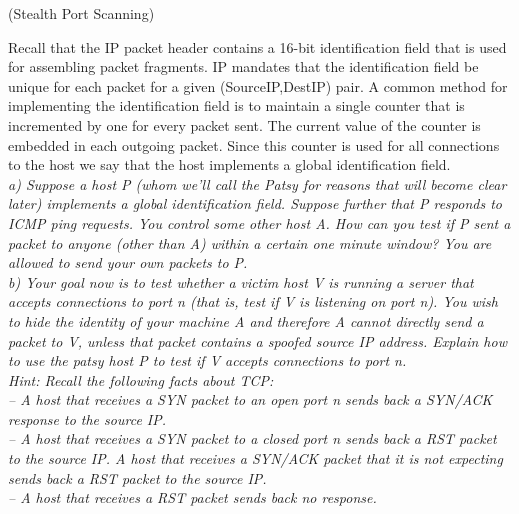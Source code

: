 \begin{prob}  (Stealth Port Scanning) 
\end{prob}

\noindent Recall that the IP packet header contains a 16-bit identification field that is used for assembling packet fragments. IP mandates that the identification field be unique for each packet for a given (SourceIP,DestIP) pair. A common method for implementing the identification field is to maintain a single counter that is incremented by one for every packet sent. The current value of the counter is embedded in each outgoing packet. Since this counter is used for all connections to the host we say that the host implements a global identification field.\\

\noindent \textit{a) Suppose a host P (whom we'll call the Patsy for reasons that will become clear later) implements a global identification field. Suppose further that P responds to ICMP ping requests. You control some other host A. How can you test if P sent a packet to anyone (other than A) within a certain one minute window? You are allowed to send your own packets to P.}\\

\noindent \textit{b) Your goal now is to test whether a victim host V is running a server that accepts connections to port n (that is, test if V is listening on port n). You wish to hide the identity of your machine A and therefore A cannot directly send a packet to V, unless that packet contains a spoofed source IP address. Explain how to use the patsy host P to test if V accepts connections to port n.\\
Hint: Recall the following facts about TCP:\\
-- A host that receives a SYN packet to an open port n sends back a SYN/ACK response to the source IP.\\
-- A host that receives a SYN packet to a closed port n sends back a RST packet to the source IP.
A host that receives a SYN/ACK packet that it is not expecting sends back a RST packet to the source IP.\\
-- A host that receives a RST packet sends back no response. }\\
